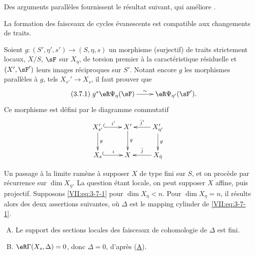 Des arguments parallèles fournissent le résultat suivant, qui améliore 
\cite[XIII 2.1.12, 2.4.2]{sga7}. 





\begin{proposition_}\label{VII:3-7}
La formation des faisceaux de cycles évanescents est compatible aux 
changements de traits. 
\end{proposition_}

Soient $g:(S',\eta',s') \to (S,\eta,s)$ un morphisme (surjectif) de traits 
strictement locaux, $X/S$, $\sF$ sur $X_\eta$, de torsion premier à la 
caractéristique résiduelle et $(X',\sF')$ leurs images réciproques sur 
$S'$. Notant encore $g$ les morphismes parallèles à $g$, tels 
$X_{s'}' \to X_s$, il faut prouver que 
\begin{equation*}\tag{3.7.1}\label{VII:eq:3-7-1}
\xymatrix{
  g^\ast \eR\Psi_\eta(\sF) \ar[r]^-\sim 
    & \eR\Psi_{\eta'}(\sF') \text{.} 
}
\end{equation*}
Ce morphisme est défini par le diagramme commutatif 
\[\xymatrix{
  X_{s'}' \ar@{^{(}->}[r]^-{i'} \ar[d]^-g 
    & X' \ar[d]^-g 
    & X_{\eta'}' \ar[l]_-{\bar j'} \ar[d]^-g \\
  X_s \ar@{^{(}->}[r]^-i 
    & X 
    & \ar[l]_-{\bar j} X_{\bar\eta} 
}\]

Un passage à la limite ramène à supposer $X$ de type fini sur $S$, et on 
procède par récurrence sur $\dim{X_\eta}$. La question étant locale, on 
peut supposer $X$ affine, puis projectif. Supposons \eqref{VII:eq:3-7-1} pour 
$\dim{X_\eta}<n$. Pour $\dim{X_\eta}=n$, il résulte alors des deux 
assertions suivantes, où $\Delta$ est le mapping cylinder de 
\eqref{VII:eq:3-7-1}. 

\begin{enumerate}[(A)]
  \item Le support des sections locales des faisceaux de cohomologie de 
    $\Delta$ est fini. 
    \hypertarget{VII:3-A}{}
  \item $\eR\Gamma(X_s,\Delta)=0$, donc $\Delta=0$, d'après 
    (\hyperlink{VII:3-A}{A}). 
    \hypertarget{VII:3-B}{}
\end{enumerate}





\subsection{}\label{VII:3-8}

